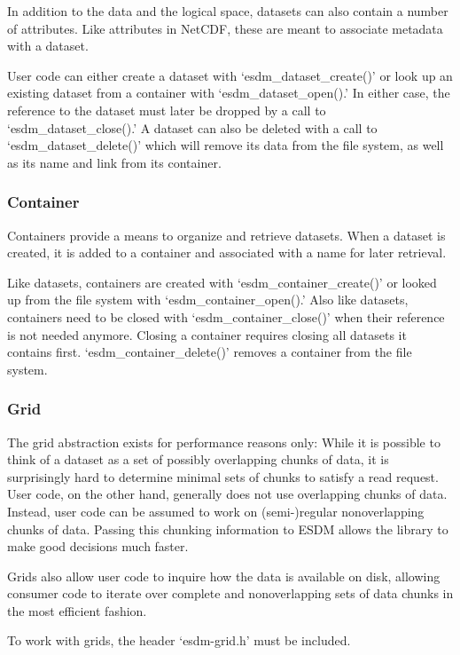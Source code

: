 In addition to the data and the logical space, datasets can also contain
a number of attributes. Like attributes in NetCDF, these are meant to
associate metadata with a dataset.

User code can either create a dataset with `esdm\_dataset\_create()' or
look up an existing dataset from a container with
`esdm\_dataset\_open().' In either case, the reference to the dataset
must later be dropped by a call to `esdm\_dataset\_close().' A dataset
can also be deleted with a call to `esdm\_dataset\_delete()' which will
remove its data from the file system, as well as its name and link from
its container.

\subsubsection{Container}

Containers provide a means to organize and retrieve datasets. When a
dataset is created, it is added to a container and associated with a
name for later retrieval.

Like datasets, containers are created with `esdm\_container\_create()'
or looked up from the file system with `esdm\_container\_open().' Also
like datasets, containers need to be closed with
`esdm\_container\_close()' when their reference is not needed anymore.
Closing a container requires closing all datasets it contains first.
`esdm\_container\_delete()' removes a container from the file system.

\subsubsection{Grid}

The grid abstraction exists for performance reasons only: While it is
possible to think of a dataset as a set of possibly overlapping chunks
of data, it is surprisingly hard to determine minimal sets of chunks to
satisfy a read request. User code, on the other hand, generally does not
use overlapping chunks of data. Instead, user code can be assumed to
work on (semi-)regular nonoverlapping chunks of data. Passing this
chunking information to ESDM allows the library to make good decisions
much faster.

Grids also allow user code to inquire how the data is available on disk,
allowing consumer code to iterate over complete and nonoverlapping sets
of data chunks in the most efficient fashion.

To work with grids, the header `esdm-grid.h' must be included.

